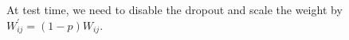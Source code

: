 At test time, we need to disable the dropout and scale the weight by $W_{ij}^{'} = (1-p) W_{ij}$. 






















































































































